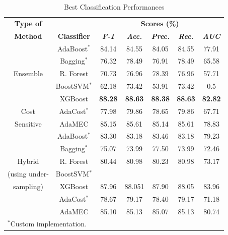 \documentclass[conference]{IEEEtran}
\begin{document}
\begin{table}[htbp]
\caption{Best Classification Performances}

\begin{center}

\begin{tabular}{|c|c|c|c|c|c|c|}

\hline
\textbf{Type of} & & \multicolumn{5}{|c|}{\textbf{Scores (\%)}} \\
\cline{3-7} 

\textbf{Method} & \textbf{Classifier} &\textbf{\textit{F-1}}& \textbf{\textit{Acc.}}&\textbf{\textit{Prec.}}&\textbf{\textit{Rec.}}&\textbf{\textit{AUC}}\\
\hline

& AdaBoost$^*$ &84.14&84.55&84.05&84.55&77.91  \\
\cline{2-7} 

& Bagging$^*$ &76.32&78.49&76.91&78.49&65.58  \\
\cline{2-7} 

Ensemble & R. Forest &70.73&76.96&78.39&76.96&57.71  \\
\cline{2-7} 

& BoostSVM$^*$ &62.18&73.42&53.91&73.42&0.5  \\
\cline{2-7} 

& XGBoost  &\textbf{88.28}&\textbf{88.63}&\textbf{88.38}&\textbf{88.63}&\textbf{82.82} \\
\hline

Cost & AdaCost$^*$ &77.98&79.86&78.65&79.86&67.71  \\
\cline{2-7} 

Sensitive& AdaMEC &85.15&85.61&85.14&85.61&78.83  \\
\hline

& AdaBoost$^*$ &83.30&83.18&83.46&83.18&79.23  \\
\cline{2-7} 

& Bagging$^*$ &75.07&73.99&77.50&73.99&72.46  \\
\cline{2-7} 

Hybrid & R. Forest &80.44&80.98&80.23&80.98&73.17  \\
\cline{2-7} 

(using under-& BoostSVM$^*$   & & & & &\\
\cline{2-7} 

sampling)& XGBoost  &87.96&88.051&87.90&88.05&83.96 \\
\cline{2-7} 

 & AdaCost$^*$ &78.67&79.17&78.40&79.17&71.18  \\
\cline{2-7} 

& AdaMEC &85.10&85.13&85.07&85.13&80.74  \\
\hline

\multicolumn{4}{l}{$^{\mathrm{*}}$Custom implementation.}

\end{tabular}

\label{tab1}
\end{center}
\end{table}
\end{document}
